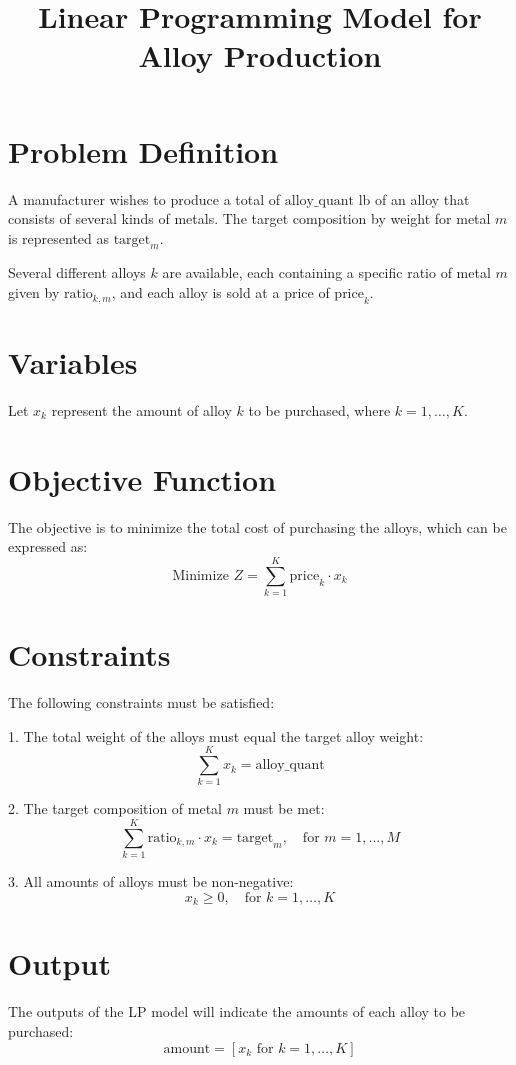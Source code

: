 \documentclass{article}
\begin{document}
\title{Linear Programming Model for Alloy Production}
\author{}
\date{}
\maketitle

\section*{Problem Definition}
A manufacturer wishes to produce a total of \( \text{alloy\_quant} \) lb of an alloy that consists of several kinds of metals. The target composition by weight for metal \( m \) is represented as \( \text{target}_m \). 

Several different alloys \( k \) are available, each containing a specific ratio of metal \( m \) given by \( \text{ratio}_{k,m} \), and each alloy is sold at a price of \( \text{price}_k \).

\section*{Variables}
Let \( x_k \) represent the amount of alloy \( k \) to be purchased, where \( k = 1, \ldots, K \).

\section*{Objective Function}
The objective is to minimize the total cost of purchasing the alloys, which can be expressed as:
\[
\text{Minimize } Z = \sum_{k=1}^{K} \text{price}_k \cdot x_k
\]

\section*{Constraints}
The following constraints must be satisfied:

1. The total weight of the alloys must equal the target alloy weight:
\[
\sum_{k=1}^{K} x_k = \text{alloy\_quant}
\]

2. The target composition of metal \( m \) must be met:
\[
\sum_{k=1}^{K} \text{ratio}_{k,m} \cdot x_k = \text{target}_m, \quad \text{for } m = 1, \ldots, M
\]

3. All amounts of alloys must be non-negative:
\[
x_k \geq 0, \quad \text{for } k = 1, \ldots, K
\]

\section*{Output}
The outputs of the LP model will indicate the amounts of each alloy to be purchased:
\[
\text{amount} = [x_k \text{ for } k = 1, \ldots, K]
\]
\end{document}
